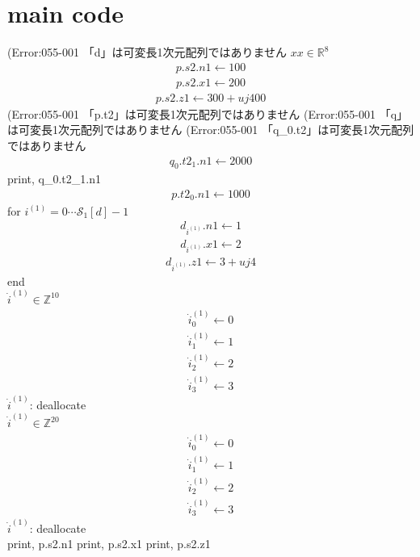 \documentclass[a4paper,fleqn]{ltjsarticle}
\begin{document}
\section{main code}
(Error:055-001 「d」は可変長1次元配列ではありません
$xx \in \mathbb{R}^{8}$\\
\begin{align}
p.s2.n1 \leftarrow 100
\end{align}
\begin{align}
p.s2.x1 \leftarrow 200
\end{align}
\begin{align}
p.s2.z1 \leftarrow 300+uj 400
\end{align}
(Error:055-001 「p.t2」は可変長1次元配列ではありません
(Error:055-001 「q」は可変長1次元配列ではありません
(Error:055-001 「q_{0}.t2」は可変長1次元配列ではありません
\begin{align}
q_{0}.t2_{1}.n1 \leftarrow 2000
\end{align}
print, q_{0}.t2_{1}.n1
\begin{align}
p.t2_{0}.n1 \leftarrow 1000
\end{align}
for $i^{(1)}=0\cdots \mathcal{S}_1[d]-1$\\
  \begin{align}
  d_{i^{(1)}}.n1 \leftarrow 1
  \end{align}
  \begin{align}
  d_{i^{(1)}}.x1 \leftarrow 2
  \end{align}
  \begin{align}
  d_{i^{(1)}}.z1 \leftarrow 3+uj 4
  \end{align}
end\\
$\dot{i}^{(1)} \in \mathbb{Z}^{10}$\\
\begin{align}
\dot{i}^{(1)}_{0} \leftarrow 0
\end{align}
\begin{align}
\dot{i}^{(1)}_{1} \leftarrow 1
\end{align}
\begin{align}
\dot{i}^{(1)}_{2} \leftarrow 2
\end{align}
\begin{align}
\dot{i}^{(1)}_{3} \leftarrow 3
\end{align}
$\dot{i}^{(1)}$: deallocate\\
$\dot{i}^{(1)} \in \mathbb{Z}^{20}$\\
\begin{align}
\dot{i}^{(1)}_{0} \leftarrow 0
\end{align}
\begin{align}
\dot{i}^{(1)}_{1} \leftarrow 1
\end{align}
\begin{align}
\dot{i}^{(1)}_{2} \leftarrow 2
\end{align}
\begin{align}
\dot{i}^{(1)}_{3} \leftarrow 3
\end{align}
$\dot{i}^{(1)}$: deallocate\\
print, p.s2.n1
print, p.s2.x1
print, p.s2.z1
\end{document}
